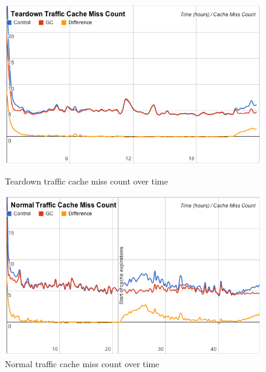 \documentclass[12pt]{ucthesis}
\begin{document}
\begin{figure}[htp]
\centering
\includegraphics[width=\textwidth]{assets/teardownMissCountXTime.png}
\caption{Teardown traffic cache miss count over time}
\label{fig:teardownMissCountXTime}

\vspace{2em}
\centering
\includegraphics[width=\textwidth]{assets/normalMissCountXTime.png}
\caption{Normal traffic cache miss count over time}
\label{fig:normalMissCountXTime}
\end{figure}
\end{document}
